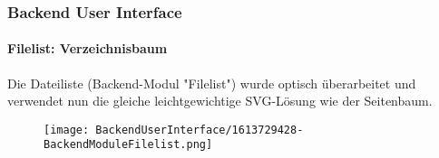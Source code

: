 %

\begin{frame}[fragile]
	\frametitle{Backend User Interface}
	\framesubtitle{Filelist: Verzeichnisbaum}

	Die Dateiliste (Backend-Modul "Filelist") wurde optisch überarbeitet
	und verwendet nun die gleiche leichtgewichtige SVG-Lösung wie der Seitenbaum.

	\begin{figure}
		\texttt{[image: BackendUserInterface/1613729428-BackendModuleFilelist.png]}
	\end{figure}

\end{frame}

